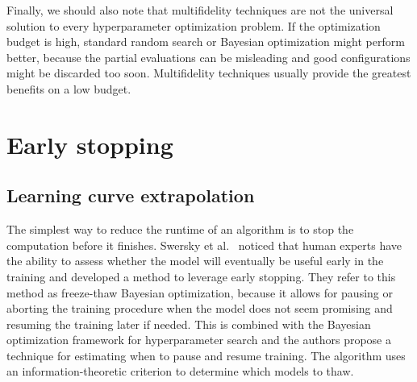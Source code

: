 Finally, we should also note that multifidelity techniques are not the universal solution to every hyperparameter optimization problem. If the optimization budget is high, standard random search or Bayesian optimization might perform better, because the partial evaluations can be misleading and good configurations might be discarded too soon. Multifidelity techniques usually provide the greatest benefits on a low budget.

\section{Early stopping}

\subsection{Learning curve extrapolation}
The simplest way to reduce the runtime of an algorithm is to stop the computation before it finishes. Swersky et al.~\cite{swersky2014freeze} noticed that human experts have the ability to assess whether the model will eventually be useful early in the training and developed a method to leverage early stopping. They refer to this method as freeze-thaw Bayesian optimization, because it allows for pausing or aborting the training procedure when the model does not seem promising and resuming the training later if needed. This is combined with the Bayesian optimization framework for hyperparameter search and the authors propose a technique for estimating when to pause and resume training. The algorithm uses an information-theoretic criterion to determine which models to thaw.

